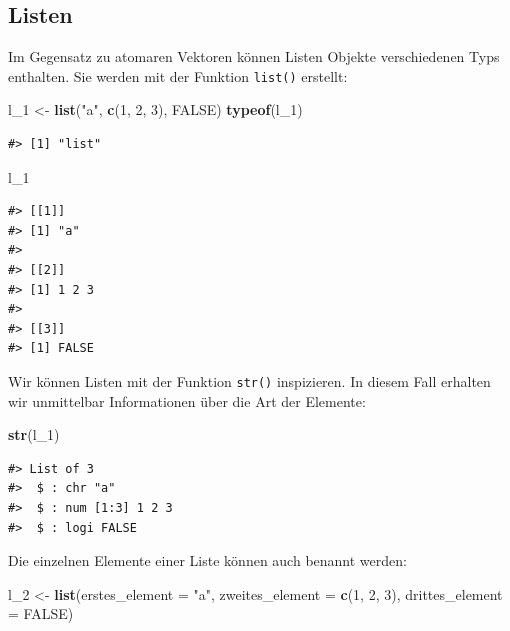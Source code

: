 \documentclass[]{tufte-book}
\newenvironment{Shaded}{}{}
\newcommand{\KeywordTok}[1]{\textcolor[rgb]{0.00,0.44,0.13}{\textbf{#1}}}
\newcommand{\DataTypeTok}[1]{\textcolor[rgb]{0.56,0.13,0.00}{#1}}
\newcommand{\DecValTok}[1]{\textcolor[rgb]{0.25,0.63,0.44}{#1}}
\newcommand{\StringTok}[1]{\textcolor[rgb]{0.25,0.44,0.63}{#1}}
\newcommand{\OtherTok}[1]{\textcolor[rgb]{0.00,0.44,0.13}{#1}}
\newcommand{\NormalTok}[1]{#1}
\begin{document}
\subsection{Listen}\label{listen}

Im Gegensatz zu atomaren Vektoren können Listen Objekte verschiedenen
Typs enthalten. Sie werden mit der Funktion \texttt{list()} erstellt:

\begin{Shaded}
\begin{Highlighting}[]
\NormalTok{l_}\DecValTok{1}\NormalTok{ <-}\StringTok{ }\KeywordTok{list}\NormalTok{(}\StringTok{"a"}\NormalTok{, }\KeywordTok{c}\NormalTok{(}\DecValTok{1}\NormalTok{, }\DecValTok{2}\NormalTok{, }\DecValTok{3}\NormalTok{), }\OtherTok{FALSE}\NormalTok{)}
\KeywordTok{typeof}\NormalTok{(l_}\DecValTok{1}\NormalTok{)}
\end{Highlighting}
\end{Shaded}

\begin{verbatim}
#> [1] "list"
\end{verbatim}

\begin{Shaded}
\begin{Highlighting}[]
\NormalTok{l_}\DecValTok{1}
\end{Highlighting}
\end{Shaded}

\begin{verbatim}
#> [[1]]
#> [1] "a"
#> 
#> [[2]]
#> [1] 1 2 3
#> 
#> [[3]]
#> [1] FALSE
\end{verbatim}

Wir können Listen mit der Funktion \texttt{str()} inspizieren. In diesem
Fall erhalten wir unmittelbar Informationen über die Art der Elemente:

\begin{Shaded}
\begin{Highlighting}[]
\KeywordTok{str}\NormalTok{(l_}\DecValTok{1}\NormalTok{)}
\end{Highlighting}
\end{Shaded}

\begin{verbatim}
#> List of 3
#>  $ : chr "a"
#>  $ : num [1:3] 1 2 3
#>  $ : logi FALSE
\end{verbatim}

Die einzelnen Elemente einer Liste können auch benannt werden:

\begin{Shaded}
\begin{Highlighting}[]
\NormalTok{l_}\DecValTok{2}\NormalTok{ <-}\StringTok{ }\KeywordTok{list}\NormalTok{(}\DataTypeTok{erstes_element =} \StringTok{"a"}\NormalTok{, }\DataTypeTok{zweites_element =} \KeywordTok{c}\NormalTok{(}\DecValTok{1}\NormalTok{, }
    \DecValTok{2}\NormalTok{, }\DecValTok{3}\NormalTok{), }\DataTypeTok{drittes_element =} \OtherTok{FALSE}\NormalTok{)}
\end{Highlighting}
\end{Shaded}
\end{document}
